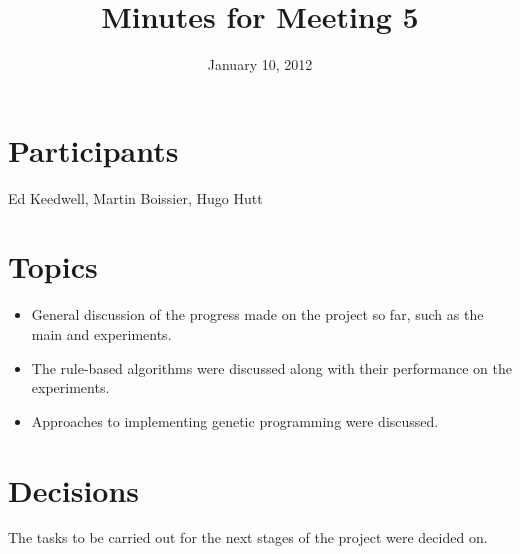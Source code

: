 \documentclass[a4paper, 11pt]{article}
\date{January 10, 2012}
\title{Minutes for Meeting 5}
\begin{document}
\maketitle

\section{Participants}

Ed Keedwell, Martin Boissier, Hugo Hutt

\section{Topics}

\begin{itemize}
\item General discussion of the progress made on the project so far,
  such as the main and experiments.
\item The rule-based algorithms were discussed along with their
  performance on the experiments.
\item Approaches to implementing genetic programming were discussed.
\end{itemize}

\section{Decisions}

The tasks to be carried out for the next stages of the project were
decided on.
\end{document}
